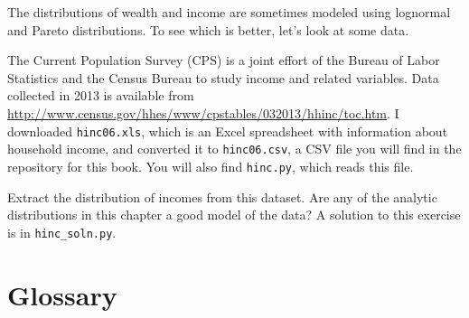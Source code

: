 \documentclass[12pt]{book}
\begin{document}
\begin{exercise}
\label{income}

The distributions of wealth and income are sometimes modeled using
lognormal and Pareto distributions.  To see which is better, let's
look at some data.

The Current Population Survey (CPS) is a joint effort of the Bureau
of Labor Statistics and the Census Bureau to study income and related
variables.  Data collected in 2013 is available from
\url{http://www.census.gov/hhes/www/cpstables/032013/hhinc/toc.htm}.
I downloaded \verb"hinc06.xls", which is an Excel spreadsheet with
information about household income, and converted it to \verb"hinc06.csv",
a CSV file you will find in the repository for this book.  You
will also find \verb"hinc.py", which reads this file.

Extract the distribution of incomes from this dataset.  Are any of the
analytic distributions in this chapter a good model of the data?  A
solution to this exercise is in \verb"hinc_soln.py".

\end{exercise}




\section{Glossary}
\end{document}
